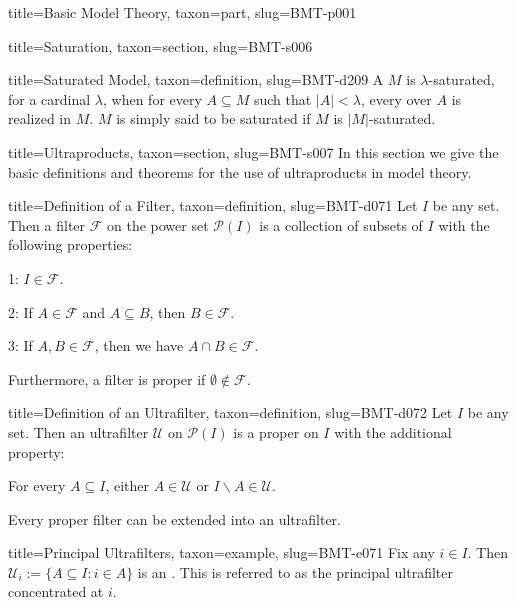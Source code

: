 \documentclass[a4paper]{article}
\begin{document}
\begin{tree}{title={Basic Model Theory}, taxon={part}, slug={BMT-p001}}
\begin{tree}{title={Saturation}, taxon={section}, slug={BMT-s006}}
\begin{tree}{title={Saturated Model}, taxon={definition}, slug={BMT-d209}}
    A  \(M\) is \(\lambda\)-saturated, for a cardinal \(\lambda\), when for every \(A \subseteq  M\) such that \(|A|< \lambda\), every  over \(A\) is realized in \(M\). \(M\) is simply said to be saturated if \(M\) is \(|M|\)-saturated.

\end{tree}

\end{tree}


  
  
\begin{tree}{title={Ultraproducts}, taxon={section}, slug={BMT-s007}}
In this section we give the basic definitions and theorems for the use of ultraproducts in model theory.
\begin{tree}{title={Definition of a Filter}, taxon={definition}, slug={BMT-d071}}
Let \(I\) be any set. Then a filter \(\mathcal {F}\) on the power set \(\mathcal {P}(I)\) is a collection of subsets of \(I\) with the following properties:\par{1: \(I \in \mathcal {F}\).}\par{2: If \(A \in   \mathcal {F}\) and \(A \subseteq  B\), then \(B \in   \mathcal {F}\).}\par{3: If \(A,B  \in   \mathcal {F}\), then we have \(A \cap  B \in   \mathcal {F}\).}\par{Furthermore, a filter is proper if \(\emptyset \notin \mathcal {F}\).}
\end{tree}

\begin{tree}{title={Definition of an Ultrafilter}, taxon={definition}, slug={BMT-d072}}
Let \(I\) be any set. Then an ultrafilter \(\mathcal {U}\) on \(\mathcal {P}(I)\) is a proper  on \(I\) with the additional property:\par{For every \(A \subseteq  I\), either \(A \in \mathcal {U}\) or \(I \backslash  A \in \mathcal {U}\).}\par{Every proper filter can be extended into an ultrafilter.}
\end{tree}

\begin{tree}{title={Principal Ultrafilters}, taxon={example}, slug={BMT-e071}}
Fix any \(i \in  I\). Then \(\mathcal {U}_i :=  \{ A \subseteq  I: i \in  A \}\) is an . This is referred to as the principal ultrafilter concentrated at \(i\).
\end{tree}


\end{tree}
\end{tree}
\end{document}
